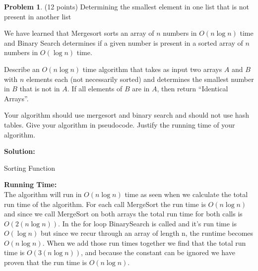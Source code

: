 \documentclass[11pt]{article}
\theoremstyle{definition}
\theoremstyle{theorem}
\newtheorem{prob}{Problem}
\begin{document}
\newpage
\begin{prob}
  \label{prob:sort_binary_search}
  (12 points) Determining the smallest element in one list that is not
  present in another list
\end{prob}

We have learned that Mergesort sorts an array of $n$ numbers in $O(n
\log n)$ time and Binary Search determines if a given number is
present in a sorted array of $n$ numbers in $O(\log n)$ time.

Describe an $O(n \log n)$ time algorithm that takes as input two
arrays $A$ and $B$ with $n$ elements each (not necessarily sorted) and
determines the smallest number in $B$ that is not in $A$.  If all
elements of $B$ are in $A$, then return ``Identical Arrays''.

Your algorithm should use mergesort and binary search and should not
use hash tables.  Give your algorithm in pseudocode.  Justify the
running time of your algorithm.
\begin{flushleft}
\textbf{Solution:}\\
\end{flushleft}
\begin{algorithm}[H]
\caption{Sorting Function}
\end{algorithm}

\begin{flushleft}
\textbf{Running Time:}\\
The algorithm will run in $O(n \log n)$ time as seen when we calculate the total run time of the algorithm. For each call MergeSort the run time is $O(n \log n)$ and since we call MergeSort on both arrays the total run time for both calls is $O (2(n \log n))$. In the for loop BinarySearch is called and it's run time is $O(\log n)$ but since we recur through an array of length n, the runtime becomes $O(n \log n)$. When we add those run times together we find that the total run time is $O (3(n \log n))$, and because the constant can be ignored we have proven that the run time is $O(n \log n)$. 
\end{flushleft}
\end{document}
